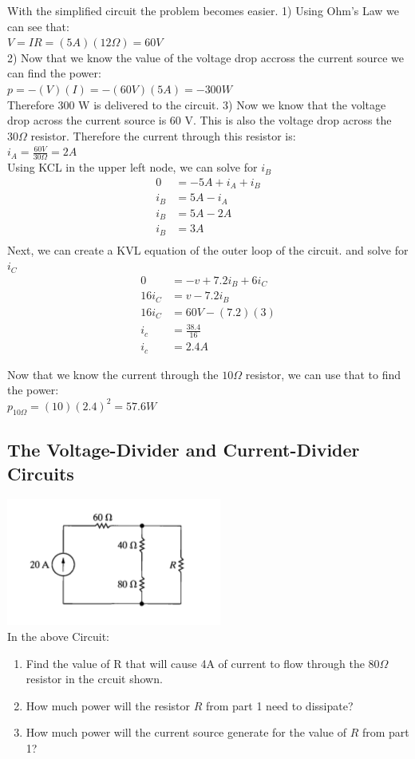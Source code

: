 With the simplified circuit the problem becomes easier. 
1) Using Ohm's Law we can see that:
\\$ V = IR = (5 A)(12 \Omega) = 60 V$\\
2) Now that we know the value of the voltage drop accross the current source we can find the power:
\\$ p = -(V)(I) = -(60 V)(5 A) = -300 W$ \\
Therefore 300 W is delivered to the circuit.
3) Now we know that the voltage drop across the current source is 60 V. This is also the voltage drop
across the $30 \Omega$ resistor. Therefore the current through this resistor is:
\\ $i_A = \frac{60 V}{30 \Omega} = 2 A $ \\
Using KCL in the upper left node, we can solve for $i_B$
\begin{align*}
	0 &= -5 A + i_A + i_B \\
	i_B &= 5A - i_A \\
	i_B &= 5A - 2A \\
	i_B &= 3A \\
\end{align*}
Next, we can create a KVL equation of the outer loop of the circuit. and solve for $i_C$
\begin{align*}
	0 &= -v + 7.2i_B + 6i_C \\
	16i_C &= v - 7.2i_B \\
	16i_C &= 60V - (7.2)(3) \\
	i_c &= \frac{38.4}{16} \\
	i_c &= 2.4 A
\end{align*}

Now that we know the current through the $10 \Omega$ resistor, we can use that to find the power:
\\$ p_{10\Omega} = (10)(2.4)^2 = 57.6W $\\

\subsection{The Voltage-Divider and Current-Divider Circuits}

\includegraphics{img/c3/p2}
\\In the above Circuit:
\begin{enumerate}
	\item Find the value of R that will cause 4A of current to flow through the $80 \Omega$
	resistor in the crcuit shown. 
	\item How much power will the resistor $R$ from part 1 need to dissipate?
	\item How much power will the current source generate for the value of $R$ from part 1?
\end{enumerate}

